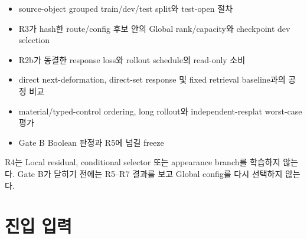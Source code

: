 \documentclass[10pt,a4paper]{article}
\begin{document}
\begin{itemize}
  \item source-object grouped train/dev/test split와 test-open 절차
  \item R3가 hash한 route/config 후보 안의 Global rank/capacity와 checkpoint dev selection
  \item R2b가 동결한 response loss와 rollout schedule의 read-only 소비
  \item direct next-deformation, direct-set response 및 fixed retrieval baseline과의 공정 비교
  \item material/typed-control ordering, long rollout와 independent-resplat worst-case 평가
  \item Gate B Boolean 판정과 R5에 넘길  freeze
\end{itemize}

R4는 Local residual, conditional selector 또는 appearance branch를 학습하지 않는다.
Gate B가 닫히기 전에는 R5--R7 결과를 보고 Global config를 다시 선택하지 않는다.

\section{진입 입력}
\label{sec:r4-chapter-2}
\end{document}
